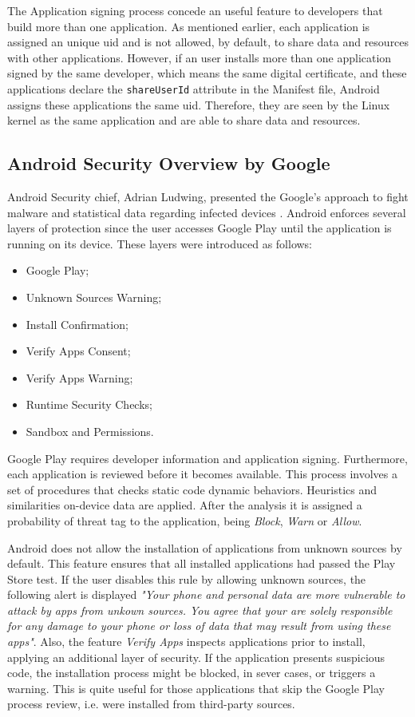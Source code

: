 The Application signing process concede an useful feature to developers that build more than one application. As mentioned earlier, each application is assigned an unique \gls{uid} and is not allowed, by default, to share data and resources with other applications. However, if an user installs more than one application signed by the same developer, which means the same digital certificate, and these applications declare the \texttt{shareUserId} attribute in the Manifest file, Android assigns these applications the same \gls{uid}. Therefore, they are seen by the Linux kernel as the same application and are able to share data and resources.

\subsection{Android Security Overview by Google}

Android Security chief, Adrian Ludwing, presented the Google's approach to fight malware and statistical data regarding infected devices \cite{VBAndroidPracticalSecurity} . Android enforces several layers of protection since the user accesses Google Play until the application is running on its device. These layers were introduced as follows:

\begin{itemize}
\item Google Play;
\item Unknown Sources Warning;
\item Install Confirmation;
\item Verify Apps Consent;
\item Verify Apps Warning;
\item Runtime Security Checks;
\item Sandbox and Permissions.
\end{itemize}

Google Play requires developer information and application signing. Furthermore, each application is reviewed before it becomes available. This process involves a set of procedures that checks static code dynamic behaviors. Heuristics and similarities on-device data are applied. After the analysis it is assigned a probability of threat tag to the application, being \textit{Block}, \textit{Warn} or \textit{Allow}.

Android does not allow the installation of applications from unknown sources by default. This feature ensures that all installed applications had passed the Play Store test. If the user disables this rule by allowing unknown sources, the following alert is displayed \textit{"Your phone and personal data are more vulnerable to attack by apps from unkown sources. You agree that your are solely responsible for any damage to your phone or loss of data that may result from using these apps"}. Also, the feature \textit{Verify Apps} inspects applications prior to install, applying an additional layer of security. If the application presents suspicious code, the installation process might be blocked, in sever cases, or triggers a warning. This is quite useful for those applications that skip the Google Play process review, i.e. were installed from third-party sources.
